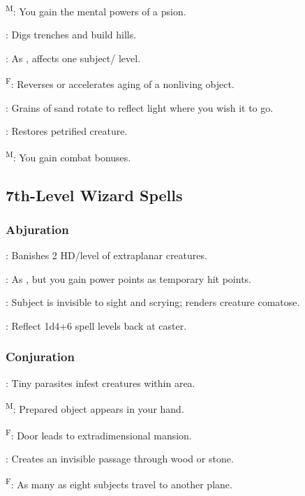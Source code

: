 	\textsuperscript{M}: You gain the mental powers of a psion.

	: Digs trenches and build hills.

	: As , affects one subject/ level.

	\textsuperscript{F}: Reverses or accelerates aging of a nonliving object. %

	: Grains of sand rotate to reflect light where you wish it to go. %

	: Restores petrified creature.

	\textsuperscript{M}: You gain combat bonuses.



\subsection{7th-Level Wizard Spells}

\subsubsection{Abjuration}
	: Banishes 2 HD/level of extraplanar creatures.

	: As , but you gain power points as temporary hit points.

	: Subject is invisible to sight and scrying; renders creature comatose.

	: Reflect 1d4+6 spell levels back at caster.

\subsubsection{Conjuration}
	: Tiny parasites infest creatures within area. %

	\textsuperscript{M}: Prepared object appears in your hand.

	\textsuperscript{F}: Door leads to extradimensional mansion.

	: Creates an invisible passage through wood or stone.

	\textsuperscript{F}: As many as eight subjects travel to another plane.

